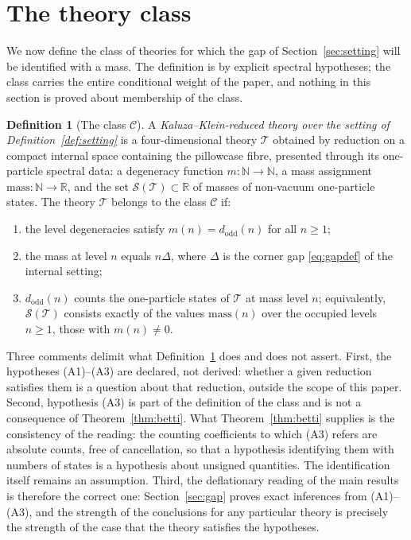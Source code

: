 \documentclass[11pt,a4paper]{article}
\newcommand{\R}{\mathbb{R}}
\newcommand{\N}{\mathbb{N}}
\newcommand{\dodd}{d_{\mathrm{odd}}}
\newcommand{\class}{\mathcal{C}}
\newcommand{\thy}{\mathcal{T}}
\theoremstyle{plain}
\theoremstyle{definition}
\newtheorem{definition}[theorem]{Definition}
\theoremstyle{remark}
\begin{document}
\section{The theory class}\label{sec:class}

We now define the class of theories for which the gap of
Section~\ref{sec:setting} will be identified with a mass. The
definition is by explicit spectral hypotheses; the class carries the
entire conditional weight of the paper, and nothing in this section
is proved about membership of the class.

\begin{definition}[The class $\class$]\label{def:class}
A \emph{Kaluza--Klein-reduced theory over the setting of
Definition~\ref{def:setting}} is a four-dimensional theory $\thy$
obtained by reduction on a compact internal space containing the
pillowcase fibre, presented through its one-particle spectral data:
a degeneracy function $m \colon \N \to \N$, a mass assignment
$\mathrm{mass} \colon \N \to \R$, and the set
$\mathcal{S}(\thy) \subset \R$ of masses of non-vacuum one-particle
states. The theory $\thy$ belongs to the class $\class$ if:
\begin{enumerate}[label=\textup{(A\arabic*)}]
\item the level degeneracies satisfy $m(n) = \dodd(n)$ for all
  $n \ge 1$;
\item the mass at level $n$ equals $n\Delta$, where $\Delta$ is the
  corner gap \eqref{eq:gapdef} of the internal setting;
\item $\dodd(n)$ counts the one-particle states of $\thy$ at mass
  level $n$; equivalently, $\mathcal{S}(\thy)$ consists exactly of
  the values $\mathrm{mass}(n)$ over the occupied levels $n \ge 1$,
  those with $m(n) \ne 0$.
\end{enumerate}
\end{definition}

Three comments delimit what Definition~\ref{def:class} does and does
not assert. First, the hypotheses (A1)--(A3) are declared, not
derived: whether a given reduction satisfies them is a question about
that reduction, outside the scope of this paper. Second, hypothesis
(A3) is part of the definition of the class and is not a consequence
of Theorem~\ref{thm:betti}. What Theorem~\ref{thm:betti} supplies is
the consistency of the reading: the counting coefficients to which
(A3) refers are absolute counts, free of cancellation, so that a
hypothesis identifying them with numbers of states is a hypothesis
about unsigned quantities. The identification itself remains an
assumption. Third, the deflationary reading of the main results is
therefore the correct one: Section~\ref{sec:gap} proves exact
inferences from (A1)--(A3), and the strength of the conclusions for
any particular theory is precisely the strength of the case that the
theory satisfies the hypotheses.
\end{document}
